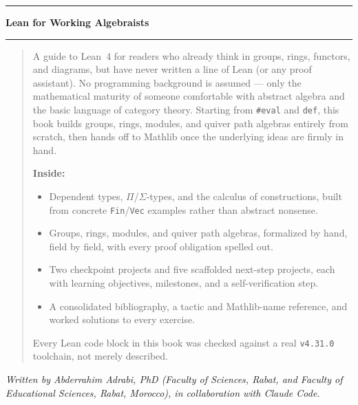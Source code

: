 \clearpage
\thispagestyle{empty}
\null\vfill

\begin{center}
{\color{ruleblue}\rule{0.5\textwidth}{1pt}}\par
\vspace{0.4cm}
{\normalfont\Large\bfseries Lean for Working Algebraists\par}
\vspace{0.4cm}
{\color{ruleblue}\rule{0.5\textwidth}{1pt}}
\end{center}

\vspace{0.8cm}
\begin{quote}
\noindent
A guide to Lean~4 for readers who already think in groups, rings,
functors, and diagrams, but have never written a line of Lean (or any
proof assistant). No programming background is assumed --- only the
mathematical maturity of someone comfortable with abstract algebra and
the basic language of category theory. Starting from \texttt{\#eval} and
\texttt{def}, this book builds groups, rings, modules, and quiver path
algebras entirely from scratch, then hands off to Mathlib once the
underlying ideas are firmly in hand.

\medskip
\noindent\textbf{Inside:}
\begin{itemize}
\item Dependent types, $\Pi$/$\Sigma$-types, and the calculus of
  constructions, built from concrete \texttt{Fin}/\texttt{Vec} examples
  rather than abstract nonsense.
\item Groups, rings, modules, and quiver path algebras, formalized by
  hand, field by field, with every proof obligation spelled out.
\item Two checkpoint projects and five scaffolded next-step projects,
  each with learning objectives, milestones, and a self-verification
  step.
\item A consolidated bibliography, a tactic and Mathlib-name reference,
  and worked solutions to every exercise.
\end{itemize}

\medskip
\noindent Every Lean code block in this book was checked against a real
\texttt{v4.31.0} toolchain, not merely described.
\end{quote}

\vspace{0.8cm}
\begin{center}
{\normalfont\itshape Written by Abderrahim Adrabi, PhD (Faculty of
Sciences, Rabat, and Faculty of Educational Sciences, Rabat, Morocco),
in collaboration with Claude Code.\par}
\end{center}

\vfill\null
